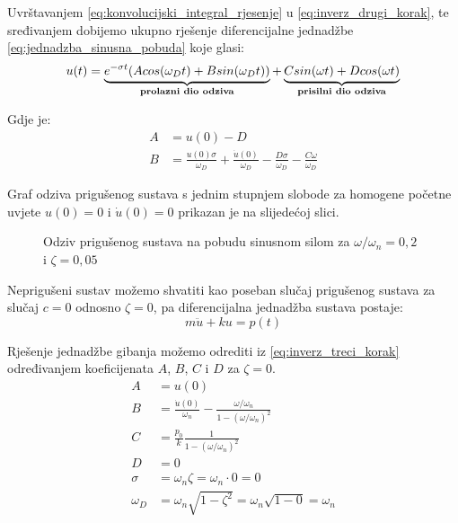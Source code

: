 Uvrštavanjem \eqref{eq:konvolucijski_integral_rjesenje} u
\eqref{eq:inverz_drugi_korak}, te sređivanjem dobijemo ukupno rješenje
diferencijalne jednadžbe \eqref{eq:jednadzba_sinusna_pobuda} koje glasi:
\begin{equation}\label{eq:inverz_treci_korak}
	u(t)=\underbrace{
            e^{-\sigma t}(Acos(\omega_D t)+Bsin(\omega_Dt))
		}_{\text{\textbf{prolazni dio odziva}}}
		+
	     \underbrace{
		Csin(\omega t) + Dcos(\omega t)
		     }_{\text{\textbf{prisilni dio odziva}}}
\end{equation}

Gdje je:
\begin{align}
    A &= u(0)-D\label{eq:koef_A}\\
    B &= \frac{u(0)\sigma}{\omega_D}+
         \frac{\dot{u}(0)}{\omega_D}-
         \frac{D\sigma}{\omega_D}-
         \frac{C\omega}{\omega_D}\label{eq:koef_B}
\end{align}

Graf odziva prigušenog sustava s jednim stupnjem slobode za homogene početne
uvjete $u(0)=0$ i $\dot{u}(0)=0$ prikazan je na slijedećoj slici.
\begin{figure}[H]
    
    \label{fig:odziv-priguseno}
    \caption{Odziv prigušenog sustava na pobudu sinusnom silom za
    $\omega/\omega_n=0,2$ i $\zeta=0,05$}
\end{figure}
\newpage

Neprigušeni sustav možemo shvatiti kao poseban slučaj prigušenog sustava za slučaj
$c=0$ odnosno $\zeta=0$, pa diferencijalna jednadžba sustava postaje:
\begin{equation}\label{eq:jednadzba_gibanja_nepriguseni_nesredjeno}
	m\ddot{u}+ku=p(t)
\end{equation}

Rješenje jednadžbe gibanja možemo odrediti iz \eqref{eq:inverz_treci_korak}
određivanjem koeficijenata $A$, $B$, $C$ i $D$ za $\zeta = 0$.
\begin{align}
    A &= u(0) \label{eq:np_koef_A}\\
    B &= \frac{\dot{u}(0)}{\omega_n}-\frac{\omega/\omega_n}{1-(\omega/\omega_n)^2}\label{eq:np_koef_B}\\
    C &= \frac{p_0}{k}\frac{1}{1-(\omega/\omega_n)^2}\label{eq:np_koef_C}\\
    D &= 0\label{eq:np_koef_D}\\
    \sigma &= \omega_n\zeta=\omega_n\cdot 0=0\label{eq:np_sigma}\\
    \omega_D &= \omega_n\sqrt{1-\zeta^2}=\omega_n\sqrt{1-0}=\omega_n\label{eq:np_omega_D}
\end{align}

